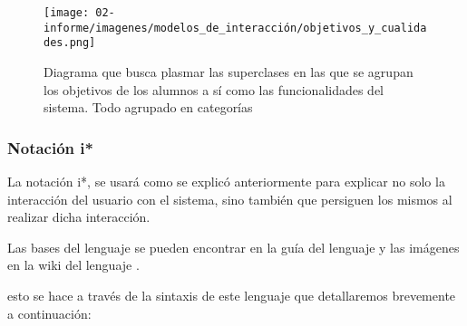     \begin{figure}[h!]
        \centering
        \texttt{[image: 02-informe/imagenes/modelos\_de\_interacción/objetivos\_y\_cualidades.png]}
        \caption{Diagrama que busca plasmar las superclases en las que se agrupan los objetivos de los alumnos a sí como las funcionalidades del sistema. Todo agrupado en categorías}
        \label{fig:my_label}
    \end{figure}
    
    \subsubsection{Notación i*}
    \par La notación \gls{i*}, se usará como se explicó anteriormente para explicar no solo la interacción del usuario con el sistema, sino también que persiguen los mismos al realizar dicha interacción.
    \par Las bases del lenguaje se pueden encontrar en la guía del lenguaje \cite{Dalpiaz2016} y las imágenes en la wiki del lenguaje \cite{No-mention2011}.
    \par esto se hace a través de la sintaxis de este lenguaje que detallaremos brevemente a continuación:
